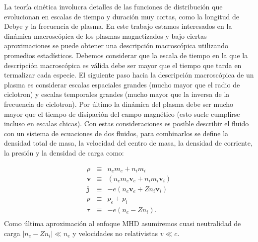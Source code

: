 \documentclass[a4paper,11pt]{report}
\begin{document}
La teoría cinética involucra detalles de las funciones de distribución que evolucionan en escalas de tiempo y duración muy cortas, como la longitud de Debye y la frecuencia de plasma. En este trabajo estamos interesados en la dinámica macroscópica de los plasmas magnetizados y bajo ciertas aproximaciones se puede obtener una descripción macroscópica utilizando promedios estadísticos. {Debemos considerar que la escala de tiempo en la que la descripción macroscópica es válida debe ser mayor que el tiempo que tarda en termalizar cada especie.}
El siguiente paso hacia la descripción macroscópica de un plasma es considerar escalas espaciales grandes (mucho mayor que el radio de ciclotron) y escalas temporales grandes (mucho mayor que la inversa de la frecuencia de ciclotron). Por último la dinámica del plasma debe ser mucho mayor que el tiempo de disipación del campo magnético (esto suele cumplirse incluso en escalas chicas). Con estas consideraciones es posible describir el fluido con un sistema de ecuaciones de dos fluidos, para combinarlos se define la densidad total de masa, la velocidad del centro de masa, la densidad de corriente, la presión y la densidad de carga como:

\begin{eqnarray}
  \rho &\equiv&  n_e m_e + n_i m_i \label{mhd_rho}\\
  \boldsymbol{v} &\equiv& (n_e m_e \boldsymbol{v}_e + n_i m_i \boldsymbol{v}_i) \label{mhd_v} \\
  \boldsymbol{j} &\equiv& -e(n_e \boldsymbol{v}_e + Z n_i \boldsymbol{v}_i) \\
  p &\equiv& p_e + p_i \label{mhd_p}\\
  \tau &\equiv& -e(n_e - Zn_i). \\
\end{eqnarray}
{Como última aproximación al enfoque MHD asumiremos cuasi neutralidad de carga $|n_e - Zn_i| \ll n_e$ y velocidades no relativistas $v \ll c$.}
\end{document}
